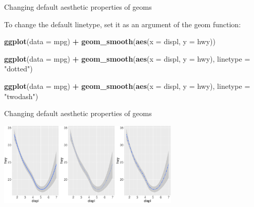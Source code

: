 \documentclass[ignorenonframetext,]{beamer}
\newenvironment{Shaded}{\begin{snugshade}}{\end{snugshade}}
\newcommand{\DataTypeTok}[1]{\textcolor[rgb]{0.13,0.29,0.53}{#1}}
\newcommand{\KeywordTok}[1]{\textcolor[rgb]{0.13,0.29,0.53}{\textbf{#1}}}
\newcommand{\NormalTok}[1]{#1}
\newcommand{\OperatorTok}[1]{\textcolor[rgb]{0.81,0.36,0.00}{\textbf{#1}}}
\newcommand{\StringTok}[1]{\textcolor[rgb]{0.31,0.60,0.02}{#1}}
\begin{document}
\begin{frame}[fragile]{Changing default aesthetic properties of geoms}
\protect\hypertarget{changing-default-aesthetic-properties-of-geoms-19}{}

To change the default linetype, set it as an argument of the geom
function:

\begin{Shaded}
\begin{Highlighting}[]
\KeywordTok{ggplot}\NormalTok{(}\DataTypeTok{data =}\NormalTok{ mpg) }\OperatorTok{+}\StringTok{ }
\StringTok{  }\KeywordTok{geom_smooth}\NormalTok{(}\KeywordTok{aes}\NormalTok{(}\DataTypeTok{x =}\NormalTok{ displ, }\DataTypeTok{y =}\NormalTok{ hwy))}

\KeywordTok{ggplot}\NormalTok{(}\DataTypeTok{data =}\NormalTok{ mpg) }\OperatorTok{+}\StringTok{ }
\StringTok{  }\KeywordTok{geom_smooth}\NormalTok{(}\KeywordTok{aes}\NormalTok{(}\DataTypeTok{x =}\NormalTok{ displ, }\DataTypeTok{y =}\NormalTok{ hwy),}
    \DataTypeTok{linetype =} \StringTok{"dotted"}\NormalTok{)}

\KeywordTok{ggplot}\NormalTok{(}\DataTypeTok{data =}\NormalTok{ mpg) }\OperatorTok{+}\StringTok{ }
\StringTok{  }\KeywordTok{geom_smooth}\NormalTok{(}\KeywordTok{aes}\NormalTok{(}\DataTypeTok{x =}\NormalTok{ displ, }\DataTypeTok{y =}\NormalTok{ hwy),}
    \DataTypeTok{linetype =} \StringTok{"twodash"}\NormalTok{)}
\end{Highlighting}
\end{Shaded}

\end{frame}

\begin{frame}{Changing default aesthetic properties of geoms}
\protect\hypertarget{changing-default-aesthetic-properties-of-geoms-20}{}

\begin{center}\includegraphics[height=150px]{data-visualization_files/figure-beamer/unnamed-chunk-53-1} \end{center}

\end{frame}
\end{document}
